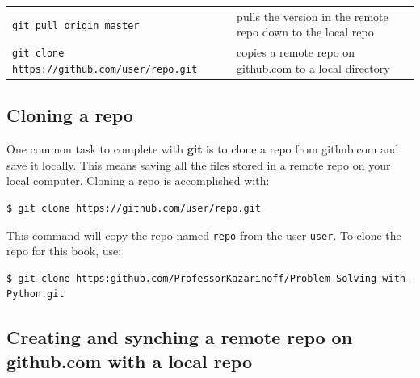 \documentclass{book}
\begin{document}
\begin{longtable}[]{@{}ll@{}}
\begin{minipage}[t]{0.05\columnwidth}
\lstinline!git pull origin master!\strut
\end{minipage} & \begin{minipage}[t]{0.05\columnwidth}\raggedright\strut
pulls the version in the remote repo down to the local repo\strut
\end{minipage}\tabularnewline
\begin{minipage}[t]{0.05\columnwidth}\raggedright\strut
\lstinline!git clone https://github.com/user/repo.git!\strut
\end{minipage} & \begin{minipage}[t]{0.05\columnwidth}\raggedright\strut
copies a remote repo on github.com to a local directory\strut
\end{minipage}\tabularnewline
\bottomrule
\end{longtable}
    




    
        \subsection{Cloning a repo}\label{cloning-a-repo}
    




    
        One common task to complete with \textbf{git} is to clone a repo from
github.com and save it locally. This means saving all the files stored
in a remote repo on your local computer. Cloning a repo is accomplished
with:

\begin{lstlisting}
$ git clone https://github.com/user/repo.git
\end{lstlisting}

This command will copy the repo named \lstinline!repo! from the user
\lstinline!user!. To clone the repo for this book, use:

\begin{lstlisting}
$ git clone https:github.com/ProfessorKazarinoff/Problem-Solving-with-Python.git
\end{lstlisting}
    




    
        \subsection{Creating and synching a remote repo on github.com with a
local
repo}\label{creating-and-synching-a-remote-repo-on-github.com-with-a-local-repo}
    
\end{document}
